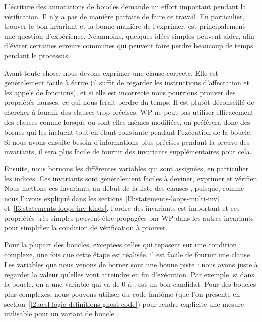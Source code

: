 

L'écriture des annotations de boucles demande un effort important pendant la
vérification. Il n'y a pas de manière parfaite de faire ce travail. En
particulier, trouver le bon invariant et la bonne manière de l'exprimer, est
principalement une question d'expérience. Néanmoins, quelques idées simples
peuvent aider, afin d'éviter certaines erreurs communes qui peuvent faire perdre
beaucoup de temps pendant le processus.


Avant toute chose, nous devons exprimer une clause 
correcte. Elle est généralement facile à écrire (il suffit de regarder les
instructions d'affectation et les appels de fonctions), et si elle est
incorrecte nous pourrions prouver des propriétés fausses, ce qui nous ferait
perdre du temps. Il est plutôt déconseillé de chercher à fournir des clauses
 trop précises. WP ne peut pas utiliser efficacement
des clauses comme  lorsque  ou
 sont elles-mêmes modifiées, on préférera donc des bornes qui
les incluent tout en étant constante pendant l'exécution de la boucle. Si nous
avons ensuite besoin d'informations plus précises pendant la preuve des
invariants, il sera plus facile de fournir des invariants supplémentaires pour
cela.


Ensuite, nous bornons les différentes variables qui sont assignées, en
particulier les indices. Ces invariants sont généralement faciles à deviner,
exprimer et vérifier. Nous mettons ces invariants au début de la liste des
clauses , puisque, comme nous l'avons expliqué
dans les sections~\ref{l3:statements-loops-multi-inv}
et~\ref{l3:statements-loops-inv-kinds}, l'ordre des invariants est important
et ces propriétés très simples peuvent être propagées par WP dans les autres
invariants pour simplifier la condition de vérification à prouver.


Pour la plupart des boucles, exceptées celles qui reposent sur une condition
complexe, une fois que cette étape est réalisée, il est facile de fournir une
clause . Les variables que nous venons de borner sont
une bonne piste : nous avons juste à regarder la valeur qu'elles vont atteindre
en fin d'exécution. Par exemple, si dans la boucle, on a une variable
 qui va de 0 à ,  est un bon
candidat. Pour des boucles plus complexes, nous pouvons utiliser du code
fantôme (que l'on présente en section~\ref{l2:acsl-logic-definitions-ghost-code})
pour rendre explicite une mesure utilisable pour un variant de boucle.


